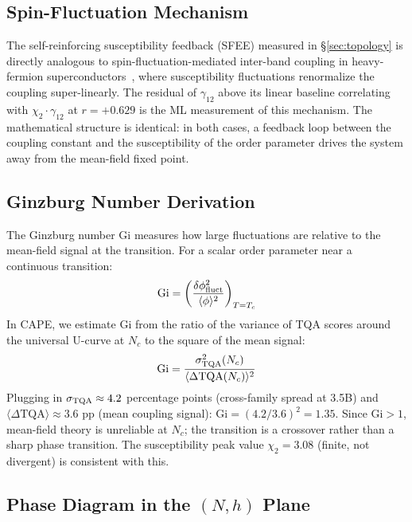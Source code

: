 \documentclass[11pt]{article}
\begin{document}
\subsection{Spin-Fluctuation Mechanism}

The self-reinforcing susceptibility feedback (SFEE) measured in \S\ref{sec:topology} is directly analogous to spin-fluctuation-mediated inter-band coupling in heavy-fermion superconductors~\cite{amin2020}, where susceptibility fluctuations renormalize the coupling super-linearly.
The residual of $\gamma_{12}$ above its linear baseline correlating with $\chi_2 \cdot \gamma_{12}$ at $r = +0.629$ is the ML measurement of this mechanism.
The mathematical structure is identical: in both cases, a feedback loop between the coupling constant and the susceptibility of the order parameter drives the system away from the mean-field fixed point.

\subsection{Ginzburg Number Derivation}

The Ginzburg number $\mathrm{Gi}$ measures how large fluctuations are relative to the mean-field signal at the transition.
For a scalar order parameter near a continuous transition:
\begin{equation}
  \mathrm{Gi} = \left(\frac{\delta\phi^2_{\rm fluct}}{\langle\phi\rangle^2}\right)_{T=T_c}
\end{equation}
In CAPE, we estimate $\mathrm{Gi}$ from the ratio of the variance of TQA scores around the universal U-curve at $N_c$ to the square of the mean signal:
\begin{equation}
  \mathrm{Gi} = \frac{\sigma^2_{\rm TQA}(N_c)}{\langle \Delta\mathrm{TQA}(N_c) \rangle^2}
\end{equation}
Plugging in $\sigma_{\rm TQA} \approx 4.2$ percentage points (cross-family spread at 3.5B) and $\langle\Delta\mathrm{TQA}\rangle \approx 3.6$ pp (mean coupling signal):
$\mathrm{Gi} = (4.2/3.6)^2 = 1.35$.
Since $\mathrm{Gi} > 1$, mean-field theory is unreliable at $N_c$; the transition is a crossover rather than a sharp phase transition.
The susceptibility peak value $\chi_2 = 3.08$ (finite, not divergent) is consistent with this.

\subsection{Phase Diagram in the $(N, h)$ Plane}
\end{document}
